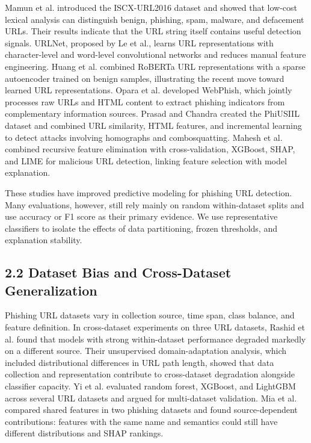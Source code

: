 \documentclass[
  10pt,
]{article}
\begin{document}
Mamun et al.\citep{Mamun2016} introduced the ISCX-URL2016 dataset and
showed that low-cost lexical analysis can distinguish benign, phishing,
spam, malware, and defacement URLs. Their results indicate that the URL
string itself contains useful detection signals. URLNet, proposed by Le
et al.\citep{Le2018URLNet}, learns URL representations with
character-level and word-level convolutional networks and reduces manual
feature engineering. Huang et al.\citep{Huang2025JISA} combined RoBERTa
URL representations with a sparse autoencoder trained on benign samples,
illustrating the recent move toward learned URL representations. Opara
et al.\citep{Opara2024} developed WebPhish, which jointly processes raw
URLs and HTML content to extract phishing indicators from complementary
information sources. Prasad and Chandra\citep{Prasad2024} created the
PhiUSIIL dataset and combined URL similarity, HTML features, and
incremental learning to detect attacks involving homographs and
combosquatting. Mahesh et al.\citep{Mahesh2026} combined recursive
feature elimination with cross-validation, XGBoost, SHAP, and LIME for
malicious URL detection, linking feature selection with model
explanation.

These studies have improved predictive modeling for phishing URL
detection. Many evaluations, however, still rely mainly on random
within-dataset splits and use accuracy or F1 score as their primary
evidence. We use representative classifiers to isolate the effects of
data partitioning, frozen thresholds, and explanation stability.

\subsection{2.2 Dataset Bias and Cross-Dataset
Generalization}\label{dataset-bias-and-cross-dataset-generalization}

Phishing URL datasets vary in collection source, time span, class
balance, and feature definition. In cross-dataset experiments on three
URL datasets, Rashid et al.\citep{Rashid2024} found that models with
strong within-dataset performance degraded markedly on a different
source. Their unsupervised domain-adaptation analysis, which included
distributional differences in URL path length, showed that data
collection and representation contribute to cross-dataset degradation
alongside classifier capacity. Yi et al.\citep{Yi2026} evaluated random
forest, XGBoost, and LightGBM across several URL datasets and argued for
multi-dataset validation. Mia et al.\citep{Mia2024} compared shared
features in two phishing datasets and found source-dependent
contributions: features with the same name and semantics could still
have different distributions and SHAP rankings.
\end{document}
